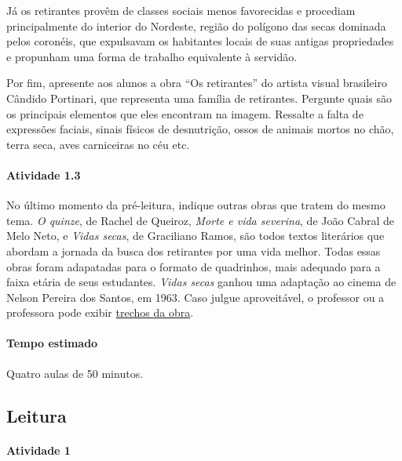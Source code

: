 \documentclass[11pt]{extarticle}
\begin{document}
Já os retirantes provêm de classes sociais menos favorecidas e procediam principalmente do interior do 
Nordeste, região do polígono das secas dominada pelos coronéis, que expulsavam os habitantes locais de suas antigas
propriedades e propunham uma forma de trabalho equivalente à servidão. 

Por fim, apresente aos alunos a obra ``Os retirantes'' do artista visual brasileiro Cândido Portinari,
que representa uma família de retirantes. Pergunte quais são os principais elementos que eles encontram
na imagem. Ressalte a falta de expressões faciais, sinais físicos de desnutrição, ossos de animais mortos
no chão, terra seca, aves carniceiras no céu etc.



\paragraph{Atividade 1.3}

No último momento da pré-leitura, indique outras obras que tratem do mesmo tema. 
\textit{O quinze}, de Rachel de Queiroz, \textit{Morte e vida severina}, de João Cabral de Melo Neto, 
e \textit{Vidas secas}, de Graciliano Ramos, são todos textos literários que abordam 
a jornada da busca dos retirantes por uma vida melhor. Todas essas obras foram adapatadas para o formato de quadrinhos, mais adequado para a faixa etária de seus estudantes. \textit{Vidas secas} ganhou uma adaptação ao cinema 
de Nelson Pereira dos Santos, em 1963. Caso julgue aproveitável, o professor ou a professora
pode exibir \href{https://www.youtube.com/watch?v=m5fsDcFOdwQ&t=9s}{trechos da obra}.

\paragraph{Tempo estimado} Quatro aulas de 50 minutos. 

\subsection{Leitura}


\paragraph{Atividade 1}
\end{document}
